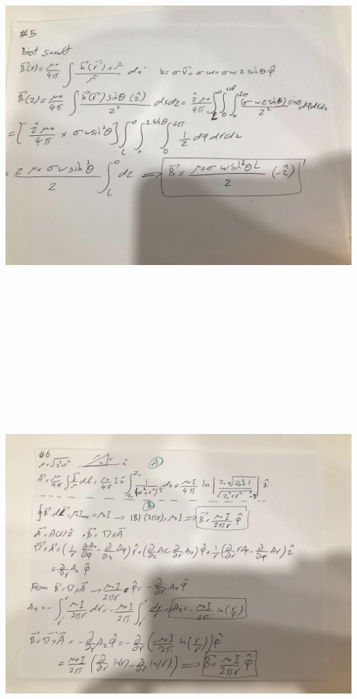 \documentclass[fleqn]{article}
\begin{document}
\begin{enumerate}
      \includegraphics[height=16cm, width=17cm]{2.jpg}

      \pagebreak

      \includegraphics[height=16cm, width=17cm]{3.jpg}


\end{enumerate}
\end{document}
